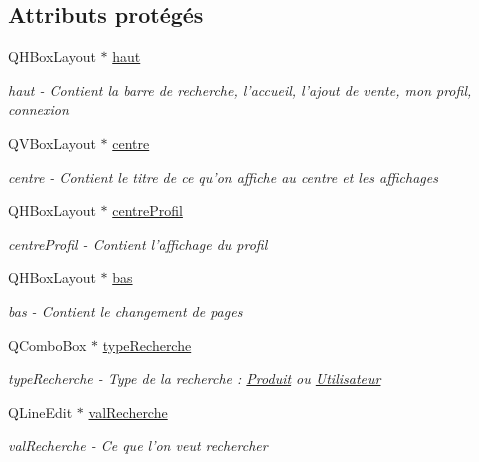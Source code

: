 \subsection*{Attributs protégés}
\begin{DoxyCompactItemize}
\item 
Q\-H\-Box\-Layout $\ast$ \hyperlink{class_ma_fenetre_acd485d3f85c155925df773f028f9e537}{haut}
\begin{DoxyCompactList}\small\item\em haut -\/ Contient la barre de recherche, l'accueil, l'ajout de vente, mon profil, connexion \end{DoxyCompactList}\item 
Q\-V\-Box\-Layout $\ast$ \hyperlink{class_ma_fenetre_aefa40adcb6099816353c31ea230ec1af}{centre}
\begin{DoxyCompactList}\small\item\em centre -\/ Contient le titre de ce qu'on affiche au centre et les affichages \end{DoxyCompactList}\item 
Q\-H\-Box\-Layout $\ast$ \hyperlink{class_ma_fenetre_a6e267fbdcd8da190e956c593664587c6}{centre\-Profil}
\begin{DoxyCompactList}\small\item\em centre\-Profil -\/ Contient l'affichage du profil \end{DoxyCompactList}\item 
Q\-H\-Box\-Layout $\ast$ \hyperlink{class_ma_fenetre_aff3315e53711db117feadab319660cee}{bas}
\begin{DoxyCompactList}\small\item\em bas -\/ Contient le changement de pages \end{DoxyCompactList}\item 
Q\-Combo\-Box $\ast$ \hyperlink{class_ma_fenetre_a3df6a320b8835369da88bf94b701ae76}{type\-Recherche}
\begin{DoxyCompactList}\small\item\em type\-Recherche -\/ Type de la recherche \-: \hyperlink{class_produit}{Produit} ou \hyperlink{class_utilisateur}{Utilisateur} \end{DoxyCompactList}\item 
Q\-Line\-Edit $\ast$ \hyperlink{class_ma_fenetre_a37836681a6d48a32dcd379b11447f579}{val\-Recherche}
\begin{DoxyCompactList}\small\item\em val\-Recherche -\/ Ce que l'on veut rechercher \end{DoxyCompactList}\item 

\end{DoxyCompactItemize}
